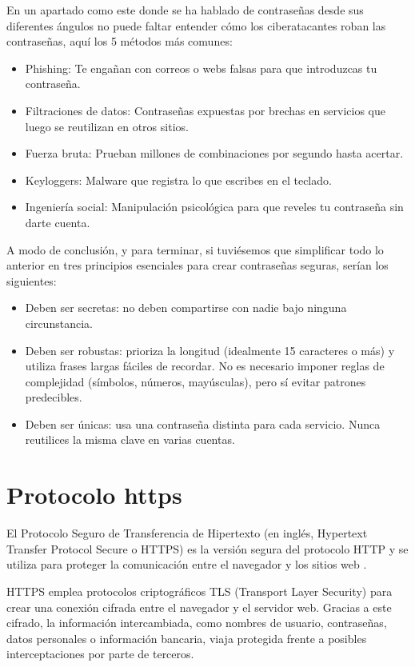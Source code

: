 \documentclass[
  spanish,
  a4paper,
  openany]{book}
\begin{document}
En un apartado como este donde se ha hablado de contraseñas desde sus diferentes ángulos no puede faltar entender cómo los ciberatacantes roban las contraseñas, aquí los 5 métodos más comunes:

\begin{itemize}
\item
  Phishing: Te engañan con correos o webs falsas para que introduzcas tu contraseña.
\item
  Filtraciones de datos: Contraseñas expuestas por brechas en servicios que luego se reutilizan en otros sitios.
\item
  Fuerza bruta: Prueban millones de combinaciones por segundo hasta acertar.
\item
  Keyloggers: Malware que registra lo que escribes en el teclado.
\item
  Ingeniería social: Manipulación psicológica para que reveles tu contraseña sin darte cuenta.
\end{itemize}

A modo de conclusión, y para terminar, si tuviésemos que simplificar todo lo anterior en tres principios esenciales para crear contraseñas seguras, serían los siguientes:

\begin{itemize}
\item
  Deben ser secretas: no deben compartirse con nadie bajo ninguna circunstancia.
\item
  Deben ser robustas: prioriza la longitud (idealmente 15 caracteres o más) y utiliza frases largas fáciles de recordar. No es necesario imponer reglas de complejidad (símbolos, números, mayúsculas), pero sí evitar patrones predecibles.
\item
  Deben ser únicas: usa una contraseña distinta para cada servicio. Nunca reutilices la misma clave en varias cuentas.
\end{itemize}

\section{Protocolo https}\label{protocolo-https}

El Protocolo Seguro de Transferencia de Hipertexto (en inglés, Hypertext Transfer Protocol Secure o HTTPS) es la versión segura del protocolo HTTP y se utiliza para proteger la comunicación entre el navegador y los sitios web \citep{WIKI-https}.

HTTPS emplea protocolos criptográficos TLS (Transport Layer Security) para crear una conexión cifrada entre el navegador y el servidor web. Gracias a este cifrado, la información intercambiada, como nombres de usuario, contraseñas, datos personales o información bancaria, viaja protegida frente a posibles interceptaciones por parte de terceros.
\end{document}
